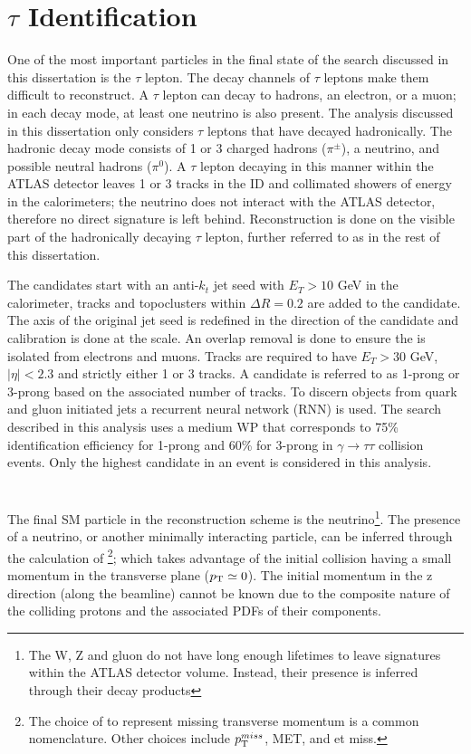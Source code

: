 	\section{$\tau$ Identification}\label{ssec:reco-tau}
	One of the most important particles in the final state of the search discussed in this dissertation is the $\tau$ lepton. The decay channels of $\tau$ leptons make them difficult to reconstruct. A $\tau$ lepton can decay to hadrons, an electron, or a muon; in each decay mode, at least one neutrino is also present. The analysis discussed in this dissertation only considers $\tau$ leptons that have decayed hadronically. The hadronic decay mode consists of 1 or 3 charged hadrons ($\pi^{\pm}$), a neutrino, and possible neutral hadrons ($\pi^0$). A $\tau$ lepton decaying in this manner within the ATLAS detector leaves 1 or 3 tracks in the ID and collimated showers of energy in the calorimeters; the neutrino does not interact with the ATLAS detector, therefore no direct signature is left behind. Reconstruction is done on the visible part of the hadronically decaying $\tau$ lepton, further referred to as \tauhad in the rest of this dissertation. 

	The \tauhad candidates start with an anti-$k_t$ jet seed with $E_T>10$ GeV in the calorimeter, tracks and topoclusters within $\Delta R = 0.2$ are added to the \tauhad candidate. The axis of the original jet seed is redefined in the direction of the \tauhad candidate and calibration is done at the \tauhad scale. An overlap removal is done to ensure the \tauhad is isolated from electrons and muons. Tracks are required to have $E_{T}>30$ GeV, $|\eta|<2.3$ and strictly either 1 or 3 tracks. A \tauhad candidate is referred to as 1-prong or 3-prong based on the associated number of tracks. To discern \tauhad objects from quark and gluon initiated jets a recurrent neural network (RNN) is used. The search described in this analysis uses a medium WP that corresponds to 75\% identification efficiency for 1-prong and 60\% for 3-prong in $\gamma \rightarrow \tau \tau$ collision events. Only the highest \pt \tauhad candidate in an event is considered in this analysis.

	\section{\Etm}\label{sec:reco-etmiss}
	The final \acrshort{SM} particle in the reconstruction scheme is the neutrino\footnote{The W, Z and gluon do not have long enough lifetimes to leave signatures within the ATLAS detector volume. Instead, their presence is inferred through their decay products}. The presence of a neutrino, or another minimally interacting particle, can be inferred through the calculation of \Etm\footnote{The choice of \Etm to represent missing transverse momentum is a common nomenclature. Other choices include $p_{\text{T}}^{miss}$, MET, and et miss.}; which takes advantage of the initial collision having a small momentum in the transverse plane ($p_{\text{T}} \simeq 0$). The initial momentum in the z direction (along the beamline) cannot be known due to the composite nature of the colliding protons and the associated PDFs of their components.

